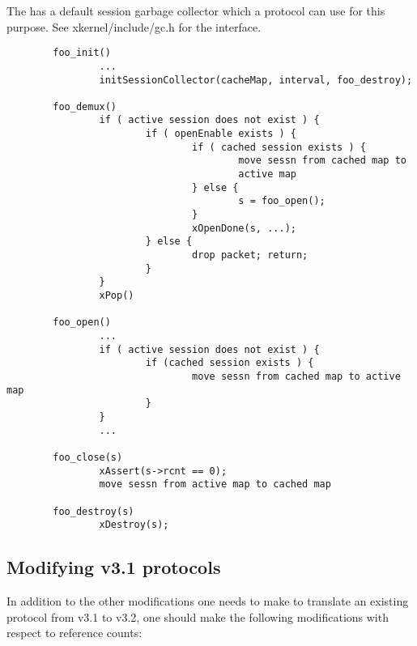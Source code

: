 \begin{itemize}
    The \xk{} has a default session garbage collector which a
    protocol can use for this purpose.  See xkernel/include/gc.h for 
    the interface.

\begin{verbatim}
        foo_init()
                ...
                initSessionCollector(cacheMap, interval, foo_destroy);

        foo_demux()
                if ( active session does not exist ) {	
                        if ( openEnable exists ) {
                                if ( cached session exists ) {
                                        move sessn from cached map to
                                        active map
                                } else {
                                        s = foo_open();
                                }
                                xOpenDone(s, ...);
                        } else {
                                drop packet; return;
                        }
                }
                xPop()
                        
        foo_open()
                ...
                if ( active session does not exist ) {
                        if (cached session exists ) {		
                                move sessn from cached map to active map
                        }
                }
                ...

        foo_close(s)
                xAssert(s->rcnt == 0);
                move sessn from active map to cached map

        foo_destroy(s)
                xDestroy(s);

\end{verbatim}

\end{itemize}


\subsection{Modifying v3.1 protocols}

In addition to the other modifications one needs to make to translate
an existing protocol from v3.1 to v3.2, one should make the following
modifications with respect to reference counts:

